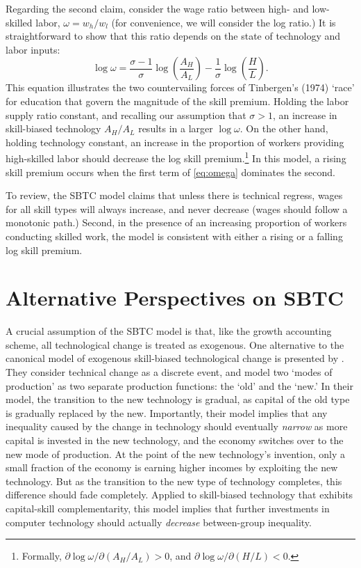 Regarding the second claim, consider the wage ratio between high- and low-skilled labor, $\omega=w_h/w_l$ (for convenience, we will consider the log ratio.) It is straightforward to show that this ratio depends on the state of technology and labor inputs:
\begin{equation}\label{eq:omega}
\log \omega = \frac{\sigma-1}{\sigma}\log\left(\frac{A_H}{A_L}\right) - \frac{1}{\sigma}\log\left(\frac{H}{L}\right).
\end{equation} %
This equation illustrates the two countervailing forces of Tinbergen's (1974) `race' for education that govern the magnitude of the skill premium. Holding the labor supply ratio constant, and recalling our assumption that $\sigma >1$, an increase in skill-biased technology $A_H/A_L$ results in a larger $\log\omega$. On the other hand, holding technology constant, an increase in the proportion of workers providing high-skilled labor should decrease the log skill premium.\footnote{Formally, $\partial \log\omega / \partial(A_H/A_L) > 0$, and 
$\partial \log\omega / \partial(H/L) < 0$.} In this model, a rising skill premium occurs when the first term of \eqref{eq:omega}  dominates the second.


To review, the SBTC model claims that unless there is technical regress, wages for all skill types will always increase, and never decrease (wages should follow a monotonic path.) Second, in the presence of an increasing proportion of workers conducting skilled work, the model is consistent with either a rising or a falling log skill premium.

\section{Alternative Perspectives on SBTC}\label{sec:dissent}

A crucial assumption of the SBTC model is that, like the \citet{Solow1957} growth accounting scheme, all technological change is treated as exogenous. One alternative to the canonical model of exogenous skill-biased technological change is presented by \citet{Beaudry2005}. They consider technical change as a discrete event, and model two `modes of production' as two separate production functions: the `old' and the `new.' In their model, the transition to the new technology is gradual, as capital of the old type is gradually replaced by the new. Importantly, their model implies that any inequality caused by the change in technology should eventually {\em narrow} as more capital is invested in the new technology, and the economy switches over to the new mode of production. At the point of the new technology's invention, only a small fraction of the economy is earning higher incomes by exploiting the new technology. But as the transition to the new type of technology completes, this difference should fade completely. Applied to skill-biased technology that exhibits capital-skill complementarity, this model implies that further investments in computer technology should actually {\em decrease} between-group inequality.

